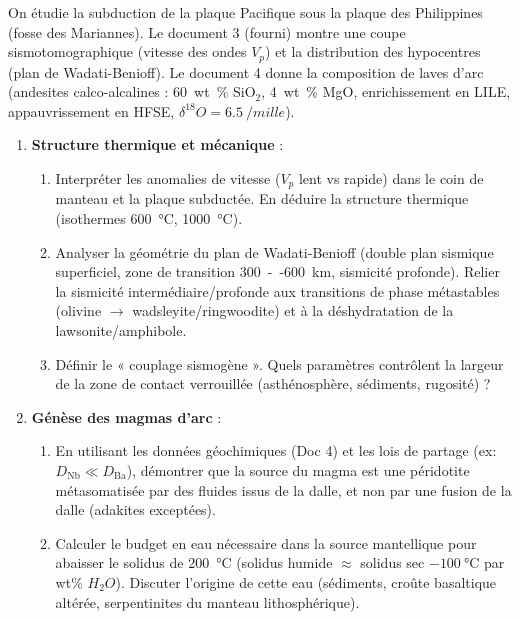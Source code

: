\documentclass[11pt]{article}
\begin{document}
\begin{exercice}
On étudie la subduction de la plaque Pacifique sous la plaque des Philippines (fosse des Mariannes). Le document 3 (fourni) montre une coupe sismotomographique (vitesse des ondes $V_p$) et la distribution des hypocentres (plan de Wadati-Benioff). Le document 4 donne la composition de laves d'arc (andesites calco-alcalines : \SI{60}{wt\%} SiO$_2$, \SI{4}{wt\%} MgO, enrichissement en LILE, appauvrissement en HFSE, $\delta^{18}O = \SI{+6,5}{\per mille}$).

\begin{enumerate}
\item \textbf{Structure thermique et mécanique} :
      \begin{enumerate}
      \item Interpréter les anomalies de vitesse ($V_p$ lent vs rapide) dans le coin de manteau et la plaque subductée. En déduire la structure thermique (isothermes \SI{600}{\celsius}, \SI{1000}{\celsius}).
      \item Analyser la géométrie du plan de Wadati-Benioff (double plan sismique superficiel, zone de transition \SI{300}{--}\SI{600}{km}, sismicité profonde). Relier la sismicité intermédiaire/profonde aux transitions de phase métastables (olivine $\to$ wadsleyite/ringwoodite) et à la déshydratation de la lawsonite/amphibole.
      \item Définir le « couplage sismogène ». Quels paramètres contrôlent la largeur de la zone de contact verrouillée (asthénosphère, sédiments, rugosité) ?
      \end{enumerate}
\item \textbf{Génèse des magmas d'arc} :
      \begin{enumerate}
      \item En utilisant les données géochimiques (Doc 4) et les lois de partage (ex: $D_{\text{Nb}} \ll D_{\text{Ba}}$), démontrer que la source du magma est une péridotite métasomatisée par des fluides issus de la dalle, et non par une fusion de la dalle (adakites exceptées).
      \item Calculer le budget en eau nécessaire dans la source mantellique pour abaisser le solidus de \SI{200}{\celsius} (solidus humide $\approx$ solidus sec $- \SI{100}{\celsius}$ par wt\% $H_2O$). Discuter l'origine de cette eau (sédiments, croûte basaltique altérée, serpentinites du manteau lithosphérique).
      \end{enumerate}

\end{enumerate}
\end{exercice}
\end{document}
